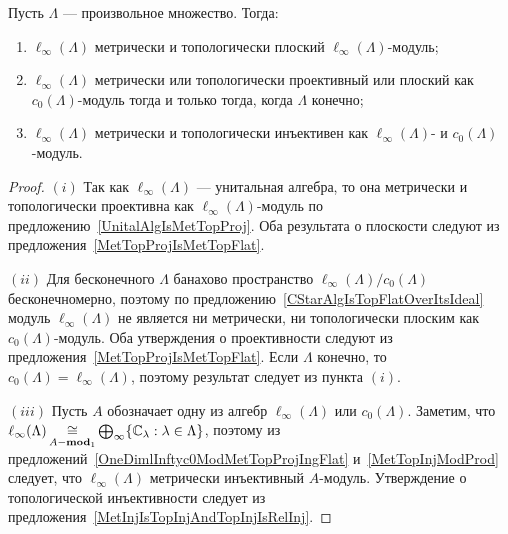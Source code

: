 \begin{proposition}\label{c0AndlInftyModlIfty} Пусть $\Lambda$ --- произвольное
множество. Тогда:

\begin{enumerate}[label = (\roman*)]
    \item $\ell_\infty(\Lambda)$ метрически и топологически плоский
    $\ell_\infty(\Lambda)$-модуль;

    \item $\ell_\infty(\Lambda)$ метрически или топологически проективный или
    плоский как $c_0(\Lambda)$-модуль тогда и только тогда, 
    когда $\Lambda$ конечно;

    \item $\ell_\infty(\Lambda)$ метрически и топологически инъективен как
    $\ell_\infty(\Lambda)$- и $c_0(\Lambda)$-модуль.
\end{enumerate}
\end{proposition}
\begin{proof} $(i)$ Так как $\ell_\infty(\Lambda)$ --- унитальная алгебра, то она
метрически и топологически проективна как $\ell_\infty(\Lambda)$-модуль по
предложению~\ref{UnitalAlgIsMetTopProj}. Оба результата о плоскости следуют из
предложения~\ref{MetTopProjIsMetTopFlat}.

$(ii)$ Для бесконечного $\Lambda$ банахово пространство
$\ell_\infty(\Lambda)/c_0(\Lambda)$ бесконечномерно, поэтому по
предложению~\ref{CStarAlgIsTopFlatOverItsIdeal} модуль $\ell_\infty(\Lambda)$ не
является ни метрически, ни топологически плоским как $c_0(\Lambda)$-модуль. Оба
утверждения о проективности следуют из предложения~\ref{MetTopProjIsMetTopFlat}.
Если $\Lambda$ конечно, то $c_0(\Lambda)=\ell_\infty(\Lambda)$, поэтому
результат следует из пункта $(i)$.

$(iii)$ Пусть $A$ обозначает одну из алгебр $\ell_\infty(\Lambda)$ или
$c_0(\Lambda)$. Заметим, что
$\ell_\infty(\Lambda)\mathop{\mathbin{\cong}}\limits_{A-\mathbf{mod}_1}\bigoplus_\infty
\{\mathbb{C}_\lambda:\lambda\in\Lambda \}$, поэтому из
предложений~\ref{OneDimlInftyc0ModMetTopProjIngFlat} и~\ref{MetTopInjModProd}
следует, что $\ell_\infty(\Lambda)$ метрически инъективный $A$-модуль.
Утверждение о топологической инъективности следует из
предложения~\ref{MetInjIsTopInjAndTopInjIsRelInj}.
\end{proof}

